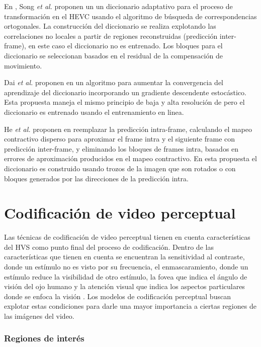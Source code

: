 En \cite{song_omp-based_2016}, Song \textit{et al.} proponen un un diccionario adaptativo para el proceso de transformaci\'on en el HEVC usando el algoritmo de b\'usqueda de correspondencias ortogonales. La construcci\'on del diccionario se realiza explotando las correlaciones no locales a partir de regiones reconstruidas (predicci\'on inter-frame), en este caso el diccionario no es entrenado. Los bloques para el diccionario se seleccionan basados en el residual de la compensaci\'on de movimiento.

Dai \textit{et al.} proponen en \cite{dai_sparse_2016} un algoritmo para aumentar la convergencia del aprendizaje del diccionario incorporando un gradiente descendente estoc\'astico. Esta propuesta maneja el mismo principio de baja y alta resoluci\'on de \cite{xiong2013sparse} pero el diccionario es entrenado usando el entrenamiento en linea.  

He \textit{et al.} proponen en \cite{he_improvement_2016} reemplazar la predicci\'on intra-frame, calculando el mapeo
contractivo disperso para aproximar el frame intra y el siguiente frame con predicci\'on inter-frame, y eliminando los bloques de frames intra, basados en errores de aproximaci\'on producidos en el mapeo contractivo. En esta propuesta el diccionario  es construido usando trozos de la imagen que son rotados o con bloques generados por las direcciones de la predicci\'on intra.

\section{Codificaci\'on de video perceptual}
\label{sec:codificacion_perceptual}

Las t\'ecnicas de codificaci\'on de video perceptual tienen en cuenta caracter\'isticas del HVS como punto final del proceso de codificaci\'on. Dentro de las caracter\'isticas que tienen en cuenta se encuentran la sensitividad al contraste, donde un est\'imulo no es visto por su frecuencia, el enmascaramiento, donde un est\'imulo reduce la visibilidad de otro est\'imulo, la fovea que indica el \'angulo de visi\'on del ojo humano y la atenci\'on visual que indica los aspectos particulares donde se enfoca la visi\'on \cite{perceptual}. Los modelos de codificaci\'on perceptual buscan explotar estas condiciones para darle una mayor importancia a ciertas regiones de las im\'agenes del video.

\subsubsection{Regiones de inter\'es}

